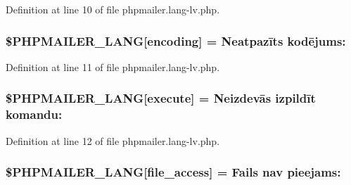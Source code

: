 Definition at line 10 of file phpmailer.\+lang-\/lv.\+php.

\subsubsection[{\texorpdfstring{\$\+P\+H\+P\+M\+A\+I\+L\+E\+R\+\_\+\+L\+A\+NG}{$PHPMAILER_LANG}}]{\setlength{\rightskip}{0pt plus 5cm}\$P\+H\+P\+M\+A\+I\+L\+E\+R\+\_\+\+L\+A\+NG\mbox{[}\textquotesingle{}encoding\textquotesingle{}\mbox{]} = \textquotesingle{}Neatpazīts kodējums\+: \textquotesingle{}}\hypertarget{phpmailer_8lang-lv_8php_a817f7283f3d54c970a0c10305cc668cc}{}\label{phpmailer_8lang-lv_8php_a817f7283f3d54c970a0c10305cc668cc}


Definition at line 11 of file phpmailer.\+lang-\/lv.\+php.

\subsubsection[{\texorpdfstring{\$\+P\+H\+P\+M\+A\+I\+L\+E\+R\+\_\+\+L\+A\+NG}{$PHPMAILER_LANG}}]{\setlength{\rightskip}{0pt plus 5cm}\$P\+H\+P\+M\+A\+I\+L\+E\+R\+\_\+\+L\+A\+NG\mbox{[}\textquotesingle{}execute\textquotesingle{}\mbox{]} = \textquotesingle{}Neizdevās izpildīt komandu\+: \textquotesingle{}}\hypertarget{phpmailer_8lang-lv_8php_a668217a9563a168f30f2a8548b6ed5a9}{}\label{phpmailer_8lang-lv_8php_a668217a9563a168f30f2a8548b6ed5a9}


Definition at line 12 of file phpmailer.\+lang-\/lv.\+php.

\subsubsection[{\texorpdfstring{\$\+P\+H\+P\+M\+A\+I\+L\+E\+R\+\_\+\+L\+A\+NG}{$PHPMAILER_LANG}}]{\setlength{\rightskip}{0pt plus 5cm}\$P\+H\+P\+M\+A\+I\+L\+E\+R\+\_\+\+L\+A\+NG\mbox{[}\textquotesingle{}file\+\_\+access\textquotesingle{}\mbox{]} = \textquotesingle{}Fails nav pieejams\+: \textquotesingle{}}\hypertarget{phpmailer_8lang-lv_8php_a7e83349023b856ef9e5c46e30ae6d51e}{}\label{phpmailer_8lang-lv_8php_a7e83349023b856ef9e5c46e30ae6d51e}



